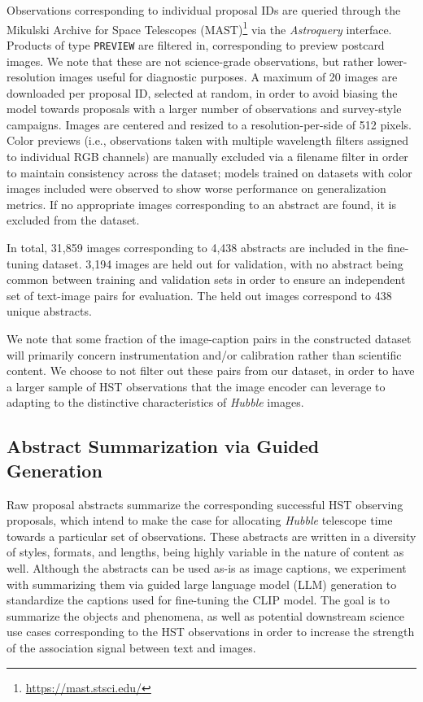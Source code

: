 \documentclass[10pt]{article} %
\newcommand{\package}[1]{\textsl{#1}\xspace}
\newcommand{\hubble}{\emph{Hubble}\xspace}
\begin{document}
Observations corresponding to individual proposal IDs are queried through the Mikulski Archive for Space Telescopes (MAST)\footnote{\url{https://mast.stsci.edu/}} via the \package{Astroquery} \citep{2019AJ....157...98G} interface.
%
Products of type \texttt{PREVIEW} are filtered in, corresponding to preview postcard images.
%
We note that these are not science-grade observations, but rather lower-resolution images useful for diagnostic purposes.
%
A maximum of 20 images are downloaded per proposal ID, selected at random, in order to avoid biasing the model towards proposals with a larger number of observations and survey-style campaigns.
%
Images are centered and resized to a resolution-per-side of 512 pixels.
%
Color previews (i.e., observations taken with multiple wavelength filters assigned to individual RGB channels) are manually excluded via a filename filter in order to maintain consistency across the dataset; models trained on datasets with color images included were observed to show worse performance on generalization metrics.
%
If no appropriate images corresponding to an abstract are found, it is excluded from the dataset.

In total, 31,859 images corresponding to 4,438 abstracts are included in the fine-tuning dataset.
%
3,194 images are held out for validation, with no abstract being common between training and validation sets in order to ensure an independent set of text-image pairs for evaluation. The held out images correspond to 438 unique abstracts.  %

We note that some fraction of the image-caption pairs in the constructed dataset will primarily concern instrumentation and/or calibration rather than scientific content.
%
We choose to not filter out these pairs from our dataset, in order to have a larger sample of HST observations that the image encoder can leverage to adapting to the distinctive characteristics of \hubble images.


\subsection{Abstract Summarization via Guided Generation}
\label{sec:summarization}

Raw proposal abstracts summarize the corresponding successful HST observing proposals, which intend to make the case for allocating \hubble telescope time towards a particular set of observations.
%
These abstracts are written in a diversity of styles, formats, and lengths, being highly variable in the nature of content as well.
%
Although the abstracts can be used as-is as image captions, we experiment with summarizing them via guided large language model (LLM) generation to standardize the captions used for fine-tuning the CLIP model.
%
The goal is to summarize the objects and phenomena, as well as potential downstream science use cases corresponding to the HST observations in order to increase the strength of the association signal between text and images.
\end{document}
